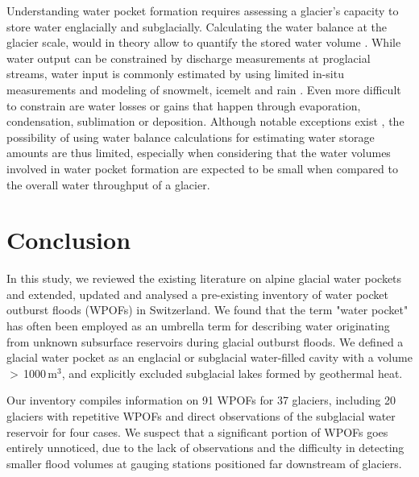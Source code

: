 Understanding water pocket formation requires assessing a glacier's capacity to store water englacially and subglacially. Calculating the water balance at the glacier scale, would in theory allow to quantify the stored water volume \citep[see][for a review on glacier storage concepts]{Jansson&al2003}. While water output can be constrained by discharge measurements at proglacial streams, water input is commonly estimated by using limited in-situ measurements and modeling of snowmelt, icemelt and rain \citep[e.g.][]{Hock2005}. Even more difficult to constrain are water losses or gains that happen through evaporation, condensation, sublimation or deposition. Although notable exceptions exist \citep[e.g.][]{Muller&al2024b}, the possibility of using water balance calculations for estimating water storage amounts are thus limited, especially when considering that the water volumes involved in water pocket formation are expected to be small when compared to the overall water throughput of a glacier. 


\section{ Conclusion}

In this study, we reviewed the existing literature on alpine glacial water pockets and extended, updated and analysed a pre-existing inventory of water pocket outburst floods (WPOFs) in Switzerland. We found that the term "water pocket" has often been employed as an umbrella term for describing water originating from unknown subsurface reservoirs during glacial outburst floods. We defined a glacial water pocket as an englacial or subglacial water-filled cavity with a volume $>$\,1000\,m$^3$, and explicitly excluded subglacial lakes formed by geothermal heat.

Our inventory compiles information on 91 WPOFs for 37 glaciers, including 20 glaciers with repetitive WPOFs and direct observations of the subglacial water reservoir for four cases. We suspect that a significant portion of WPOFs goes entirely unnoticed, due to the lack of observations and the difficulty in detecting smaller flood volumes at gauging stations positioned far downstream of glaciers. 

